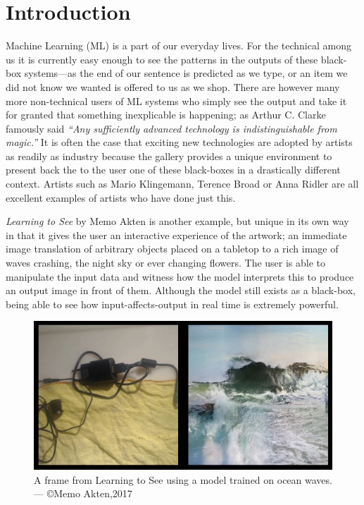 \documentclass{article}
\begin{document}
\clearpage

\section{Introduction}
Machine Learning (ML) is a part of our everyday lives. For the technical among us it is currently easy enough to see the patterns in the outputs of these black-box systems---as the end of our sentence is predicted as we type, or an item we did not know we wanted is offered to us as we shop. There are however many more non-technical users of ML systems who simply see the output and take it for granted that something inexplicable is happening; as Arthur C. Clarke famously said \textit{``Any sufficiently advanced technology is indistinguishable from magic.''}\cite{toffler_1972} It is often the case that exciting new technologies are adopted by artists as readily as industry because the gallery provides a unique environment to present back the to the user one of these black-boxes in a drastically different context. Artists such as Mario Klingemann\cite{mario_klingemann}, Terence Broad\cite{terry_broad} or Anna Ridler\cite{anna_ridler} are all excellent examples of artists who have done just this.

\textit{Learning to See} by Memo Akten\cite{lts_memo} is another example, but unique in its own way in that it gives the user an interactive experience of the artwork; an immediate image translation of arbitrary objects placed on a tabletop to a rich image of waves crashing, the night sky or ever changing flowers. The user is able to manipulate the input data and witness how the model interprets this to produce an output image in front of them. Although the model still exists as a black-box, being able to see how input-affects-output in real time is extremely powerful.

\begin{figure}[h]
	\centering
	\includegraphics[scale=0.3]{lts_still}
	\caption{A frame from Learning to See using a model trained on ocean waves. --- \copyright Memo Akten,2017}
\end{figure}
\end{document}
